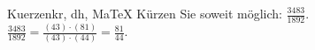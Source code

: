 \begin{MAufgabe}{Kuerzen}{kr, dh, MaTeX}
K\"urzen Sie soweit m\"oglich: $\frac{3483}{1892}$.\\ 
\ifLsg\MLoesung
\quad $\frac{3483}{1892}=\frac{(43)\cdot(81)}{(43)\cdot(44)}=\frac{81}{44}$.\else\relax\fi
 \end{MAufgabe}